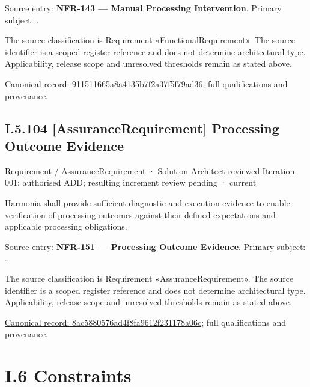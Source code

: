 Source entry: \textbf{NFR-143 — Manual Processing Intervention}. Primary subject: \texttt{}.



The source classification is Requirement «FunctionalRequirement». The source identifier is a scoped register reference and does not determine architectural type. Applicability, release scope and unresolved thresholds remain as stated above.


{\footnotesize \href{../../../../../../../continuum/motivation/requirement/functional-requirement/911511665a8a4135b7f2a37f5f79ad36.md}{Canonical record: 911511665a8a4135b7f2a37f5f79ad36}; full qualifications and provenance.}\par
\section*{I.5.104 [AssuranceRequirement] Processing Outcome Evidence}
\label{navigation:I.5.104}

\label{element:8ac5880576ad4f8fa9612f231178a06c}
{\small Requirement / AssuranceRequirement · Solution Architect-reviewed Iteration 001; authorised ADD; resulting increment review pending · current}\par

Harmonia shall provide sufficient diagnostic and execution evidence to enable verification of processing outcomes against their defined expectations and applicable processing obligations.



Source entry: \textbf{NFR-151 — Processing Outcome Evidence}. Primary subject: \texttt{}.



The source classification is Requirement «AssuranceRequirement». The source identifier is a scoped register reference and does not determine architectural type. Applicability, release scope and unresolved thresholds remain as stated above.


{\footnotesize \href{../../../../../../../continuum/motivation/requirement/assurance-requirement/8ac5880576ad4f8fa9612f231178a06c.md}{Canonical record: 8ac5880576ad4f8fa9612f231178a06c}; full qualifications and provenance.}\par
\chapter*{I.6 Constraints}
\label{navigation:I.6}

